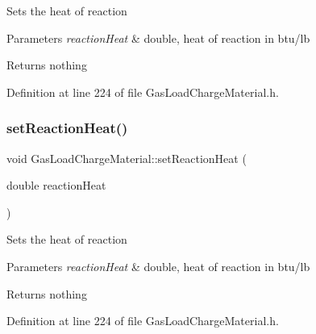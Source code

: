 Sets the heat of reaction


\begin{DoxyParams}{Parameters}
{\em reaction\+Heat} & double, heat of reaction in btu/lb\\
\hline
\end{DoxyParams}
\begin{DoxyReturn}{Returns}
nothing 
\end{DoxyReturn}


Definition at line 224 of file Gas\+Load\+Charge\+Material.\+h.

\mbox{\label{class_gas_load_charge_material_a721f02cbd0bfbb6ebe67c0da09f0b0f2}} 
\subsubsection{\texorpdfstring{set\+Reaction\+Heat()}{setReactionHeat()}\hspace{0.1cm}{\footnotesize\ttfamily [2/3]}}
{\footnotesize\ttfamily void Gas\+Load\+Charge\+Material\+::set\+Reaction\+Heat (\begin{DoxyParamCaption}\item[{double}]{reaction\+Heat }\end{DoxyParamCaption})\hspace{0.3cm}{\ttfamily [inline]}}

Sets the heat of reaction


\begin{DoxyParams}{Parameters}
{\em reaction\+Heat} & double, heat of reaction in btu/lb\\
\hline
\end{DoxyParams}
\begin{DoxyReturn}{Returns}
nothing 
\end{DoxyReturn}


Definition at line 224 of file Gas\+Load\+Charge\+Material.\+h.

\mbox{\label{class_gas_load_charge_material_a721f02cbd0bfbb6ebe67c0da09f0b0f2}} 

